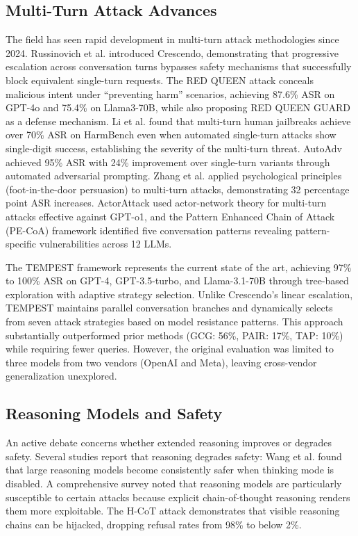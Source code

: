 \documentclass[11pt,a4paper]{article}
\begin{document}
\subsection{Multi-Turn Attack Advances}

The field has seen rapid development in multi-turn attack methodologies since 2024. Russinovich et al. \cite{russinovich2024crescendo} introduced Crescendo, demonstrating that progressive escalation across conversation turns bypasses safety mechanisms that successfully block equivalent single-turn requests. The RED QUEEN attack \cite{jiang2024redqueen} conceals malicious intent under ``preventing harm'' scenarios, achieving 87.6\% ASR on GPT-4o and 75.4\% on Llama3-70B, while also proposing RED QUEEN GUARD as a defense mechanism. Li et al. \cite{li2024llm} found that multi-turn human jailbreaks achieve over 70\% ASR on HarmBench even when automated single-turn attacks show single-digit success, establishing the severity of the multi-turn threat. AutoAdv \cite{chen2025autoadv} achieved 95\% ASR with 24\% improvement over single-turn variants through automated adversarial prompting. Zhang et al. \cite{zhang2025deception} applied psychological principles (foot-in-the-door persuasion) to multi-turn attacks, demonstrating 32 percentage point ASR increases. ActorAttack \cite{cheng2024derail} used actor-network theory for multi-turn attacks effective against GPT-o1, and the Pattern Enhanced Chain of Attack (PE-CoA) framework \cite{wu2025pattern} identified five conversation patterns revealing pattern-specific vulnerabilities across 12 LLMs.

The TEMPEST framework \cite{zhou2025tempest} represents the current state of the art, achieving 97\% to 100\% ASR on GPT-4, GPT-3.5-turbo, and Llama-3.1-70B through tree-based exploration with adaptive strategy selection. Unlike Crescendo's linear escalation, TEMPEST maintains parallel conversation branches and dynamically selects from seven attack strategies based on model resistance patterns. This approach substantially outperformed prior methods (GCG: 56\%, PAIR: 17\%, TAP: 10\%) while requiring fewer queries. However, the original evaluation was limited to three models from two vendors (OpenAI and Meta), leaving cross-vendor generalization unexplored.

\subsection{Reasoning Models and Safety}

An active debate concerns whether extended reasoning improves or degrades safety. Several studies report that reasoning degrades safety: Wang et al. \cite{wang2025outthink} found that large reasoning models become consistently safer when thinking mode is disabled. A comprehensive survey \cite{zhang2025lrmsafety} noted that reasoning models are particularly susceptible to certain attacks because explicit chain-of-thought reasoning renders them more exploitable. The H-CoT attack \cite{li2025hcot} demonstrates that visible reasoning chains can be hijacked, dropping refusal rates from 98\% to below 2\%.
\end{document}
